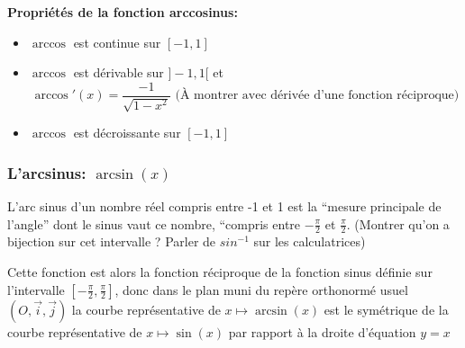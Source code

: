 \begin{center}
\end{center}

\textbf{Propriétés de la fonction arccosinus: }
\begin{itemize}[label=$\bullet$, leftmargin=2cm]
\item $\arccos$ est continue sur  $[-1,1]$
\item $\arccos$ est dérivable sur $]-1,1[$ et
  \[
    \arccos'(x)=\frac{-1}{\sqrt{1-x^2}} \text{ (À montrer avec dérivée
      d'une fonction réciproque)}
  \]
\item $\arccos$ est décroissante sur $[-1,1]$
\end{itemize}

\subsubsection{L'arcsinus: $\arcsin(x)$}

L'arc sinus d'un nombre réel compris entre -1 et 1 est la ``mesure principale
de l'angle'' dont le sinus vaut ce nombre, ``compris entre  $-\frac{\pi}{2}$ et
$\frac{\pi}{2}$. (Montrer qu'on a bijection sur cet intervalle ? Parler de $sin^{-1}$ sur
les calculatrices)

Cette fonction est alors la fonction réciproque de la fonction sinus définie
sur l'intervalle $[-\frac{\pi}{2},\frac{\pi}{2}]$, donc dans le plan muni du repère orthonormé usuel
$(O,\vec{i}, \vec{j})$ la courbe représentative de $x \mapsto \arcsin(x)$ est le
symétrique de la courbe représentative de $x \mapsto \sin(x)$ par rapport à
la droite d'équation $y=x$

\begin{center}
\end{center}

